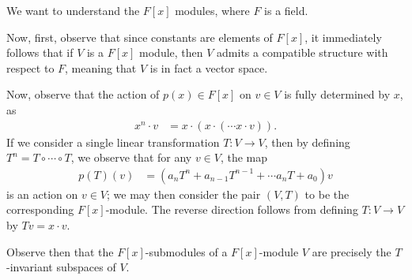 \documentclass[10pt]{mypackage}
\begin{document}
\begin{example}
  We want to understand the $F[x]$ modules, where $F$ is a field.\newline

  Now, first, observe that since constants are elements of $F[x]$, it immediately follows that if $V$ is a $F[x]$ module, then $V$ admits a compatible structure with respect to $F$, meaning that $V$ is in fact a vector space.\newline

  Now, observe that the action of $p(x)\in F[x]$ on $v\in V$ is fully determined by $x$, as
  \begin{align*}
    x^{n}\cdot v &= x\cdot \left( x\cdot \left( \cdots x\cdot v \right) \right).
  \end{align*}
  If we consider a single linear transformation $T\colon V\rightarrow V$, then by defining $T^{n} = T\circ\cdots\circ T$, we observe that for any $v\in V$, the map
  \begin{align*}
    p(T)(v) &= \left( a_nT^{n} + a_{n-1}T^{n-1} + \cdots a_n T + a_0 \right)v
  \end{align*}
  is an action on $v\in V$; we may then consider the pair $\left( V,T \right)$ to be the corresponding $F[x]$-module. The reverse direction follows from defining $T\colon V\rightarrow V$ by $Tv = x\cdot v$.\newline

  Observe then that the $F[x]$-submodules of a $F[x]$-module $V$ are precisely the $T$-invariant subspaces of $V$.
\end{example}
\end{document}
